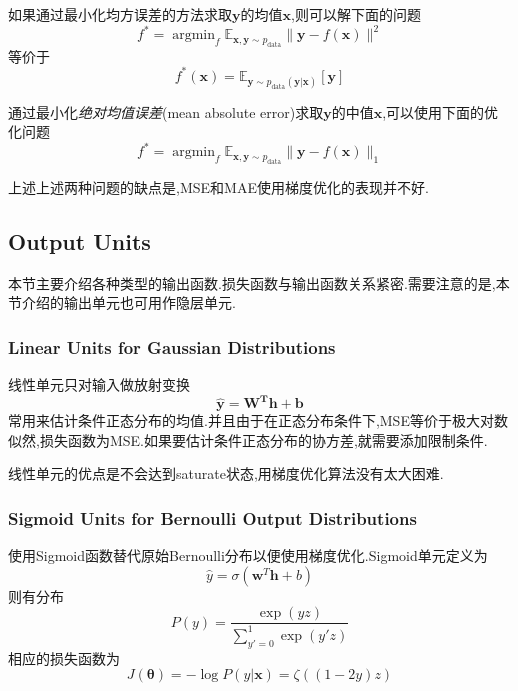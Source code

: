 如果通过最小化均方误差的方法求取$\bm y$的均值$\bm x$,则可以解下面的问题
\begin{equation}
f^\ast=\mathop{\arg\min}_{f}\mathbb E_{\bm{x,y}\sim p_{\text{data}}}\|\bm y-f(\bm x)\|^2
\end{equation}
等价于
\begin{equation}
f^\ast(\bm x)=\mathbb E_{\bm y\sim p_{\text{data}}(\bm y|\bm x)}[\bm y]
\end{equation}

通过最小化\textit{绝对均值误差}(mean absolute error)求取$\bm y$的中值$\bm x$,可以使用下面的优化问题
\begin{equation}
f^\ast=\mathop{\arg\min}_{f}\mathbb E_{\bm{x,y}\sim p_{\text{data}}}\|\bm y-f(\bm x)\|_1
\end{equation}

上述上述两种问题的缺点是,MSE和MAE使用梯度优化的表现并不好.

\subsection{Output Units}

本节主要介绍各种类型的输出函数.损失函数与输出函数关系紧密.需要注意的是,本节介绍的输出单元也可用作隐层单元.

\subsubsection{Linear Units for Gaussian Distributions}

线性单元只对输入做放射变换
\begin{equation}
\bm{\hat y=W^Th+b}
\end{equation}
常用来估计条件正态分布的均值.并且由于在正态分布条件下,MSE等价于极大对数似然,损失函数为MSE.如果要估计条件正态分布的协方差,就需要添加限制条件.

线性单元的优点是不会达到saturate状态,用梯度优化算法没有太大困难.

\subsubsection{Sigmoid Units for Bernoulli Output Distributions}

使用Sigmoid函数替代原始Bernoulli分布以便使用梯度优化.Sigmoid单元定义为
\begin{equation}
\hat y=\sigma(\bm w^T\bm h+b)
\end{equation}
则有分布
\begin{equation}
P(y)=\frac{\exp{(yz)}}{\sum_{y'=0}^1\exp(y'z)}
\end{equation}
相应的损失函数为
\begin{equation}
J({\bm\theta})=-\log P(y|\bm x)=\zeta((1-2y)z)
\end{equation}

